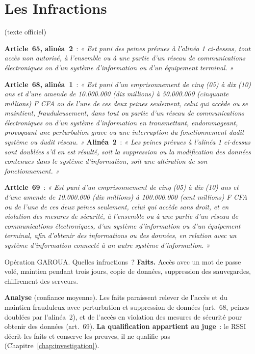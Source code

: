 \section{Les Infractions}
\label{sec:c11-infractions}

\begin{boxjuris}
\textbf{} (texte officiel)

\medskip
\textbf{Article~65, alinéa~2}~: \textit{« Est puni des peines prévues à
l'alinéa 1 ci-dessus, tout accès non autorisé, à l'ensemble ou à une
partie d'un réseau de communications électroniques ou d'un système
d'information ou d'un équipement terminal. »}

\medskip
\textbf{Article~68, alinéa~1}~: \textit{« Est puni d'un emprisonnement de
cinq (05) à dix (10) ans et d'une amende de 10.000.000 (dix millions) à
50.000.000 (cinquante millions) F CFA ou de l'une de ces deux peines
seulement, celui qui accède ou se maintient, frauduleusement, dans tout ou
partie d'un réseau de communications électroniques ou d'un système
d'information en transmettant, endommageant, provoquant une perturbation
grave ou une interruption du fonctionnement dudit système ou dudit
réseau. »} \textbf{Alinéa~2}~: \textit{« Les peines prévues à l'alinéa 1
ci-dessus sont doublées s'il en est résulté, soit la suppression ou la
modification des données contenues dans le système d'information, soit
une altération de son fonctionnement. »}

\medskip
\textbf{Article~69}~: \textit{« Est puni d'un emprisonnement de cinq (05)
à dix (10) ans et d'une amende de 10.000.000 (dix millions) à
100.000.000 (cent millions) F CFA ou de l'une de ces deux peines
seulement, celui qui accède sans droit, et en violation des mesures de
sécurité, à l'ensemble ou à une partie d'un réseau de communications
électroniques, d'un système d'information ou d'un équipement terminal,
afin d'obtenir des informations ou des données, en relation avec un
système d'information connecté à un autre système d'information. »}
\end{boxjuris}

\begin{boxscenario}{Opération GAROUA. Quelles infractions~?}
\textbf{Faits.} Accès avec un mot de passe volé, maintien pendant trois
jours, copie de données, suppression des sauvegardes, chiffrement des
serveurs.

\medskip
\textbf{Analyse} (confiance moyenne). Les faits paraissent relever de
l'accès et du maintien frauduleux avec perturbation et suppression de
données (art.~68, peines doublées par l'alinéa~2), et de l'accès en
violation des mesures de sécurité pour obtenir des données (art.~69).
\textbf{La qualification appartient au juge}~: le RSSI décrit les faits et
conserve les preuves, il ne qualifie pas (Chapitre~\ref{chap:investigation}).
\end{boxscenario}

